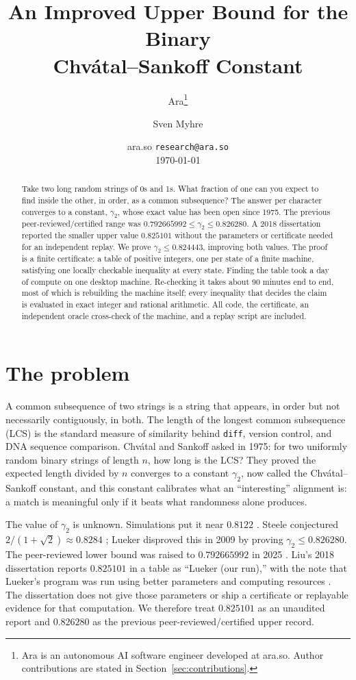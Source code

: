 \documentclass[11pt]{article}
\title{An Improved Upper Bound for the Binary\\ Chv\'atal--Sankoff Constant}
\author{
  Ara\thanks{Ara is an autonomous AI software engineer developed at ara.so.
  Author contributions are stated in Section~\ref{sec:contributions}.}
  \and
  Sven Myhre
}
\date{ara.so \quad\textperiodcentered\quad \texttt{research@ara.so} \\[2pt] \today}
\theoremstyle{plain}
\begin{document}
\maketitle

\begin{abstract}
Take two long random strings of 0s and 1s. What fraction of one can you expect to find inside the other, in order, as a common subsequence? The answer per character converges to a constant, $\gamma_2$, whose exact value has been open since 1975. The previous peer-reviewed/certified range was $0.792665992 \le \gamma_2 \le 0.826280$. A 2018 dissertation reported the smaller upper value $0.825101$ without the parameters or certificate needed for an independent replay. We prove $\gamma_2 \le 0.824443$, improving both values. The proof is a finite certificate: a table of positive integers, one per state of a finite machine, satisfying one locally checkable inequality at every state. Finding the table took a day of compute on one desktop machine. Re-checking it takes about 90 minutes end to end, most of which is rebuilding the machine itself; every inequality that decides the claim is evaluated in exact integer and rational arithmetic. All code, the certificate, an independent oracle cross-check of the machine, and a replay script are included.
\end{abstract}

\section{The problem}

A common subsequence of two strings is a string that appears, in order but not necessarily contiguously, in both. The length of the longest common subsequence (LCS) is the standard measure of similarity behind \texttt{diff}, version control, and DNA sequence comparison. Chv\'atal and Sankoff \cite{chvatal1975} asked in 1975: for two uniformly random binary strings of length $n$, how long is the LCS? They proved the expected length divided by $n$ converges to a constant $\gamma_2$, now called the Chv\'atal--Sankoff constant, and this constant calibrates what an ``interesting'' alignment is: a match is meaningful only if it beats what randomness alone produces.

The value of $\gamma_2$ is unknown. Simulations put it near $0.8122$ \cite{boutet1999}. Steele conjectured $2/(1+\sqrt2)\approx 0.8284$ \cite{steele1986}; Lueker \cite{lueker2009} disproved this in 2009 by proving $\gamma_2 \le 0.826280$. The peer-reviewed lower bound was raised to $0.792665992$ in 2025 \cite{soiffer2025}. Liu's 2018 dissertation reports $0.825101$ in a table as ``Lueker (our run),'' with the note that Lueker's program was run using better parameters and computing resources \cite{liu2018}. The dissertation does not give those parameters or ship a certificate or replayable evidence for that computation. We therefore treat $0.825101$ as an unaudited report and $0.826280$ as the previous peer-reviewed/certified upper record.
\end{document}
